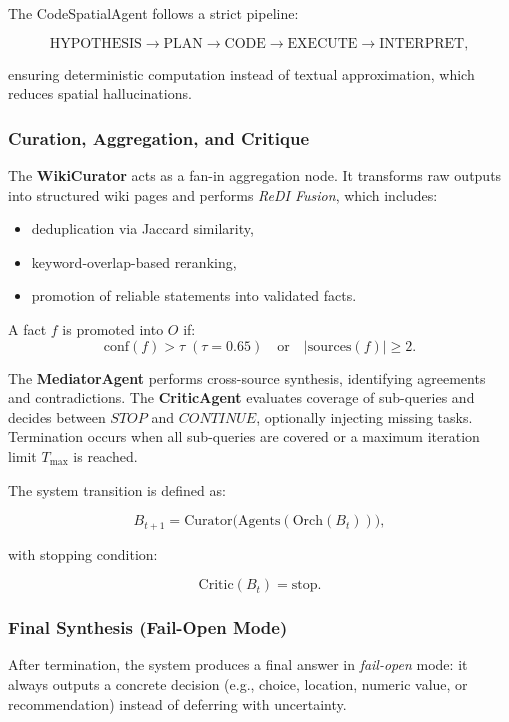 The CodeSpatialAgent follows a strict pipeline:

\[
\text{HYPOTHESIS} \rightarrow \text{PLAN} \rightarrow \text{CODE} \rightarrow \text{EXECUTE} \rightarrow \text{INTERPRET},
\]

ensuring deterministic computation instead of textual approximation, which reduces spatial hallucinations.

\subsubsection{Curation, Aggregation, and Critique}

The \textbf{WikiCurator} acts as a fan-in aggregation node.
It transforms raw outputs into structured wiki pages and performs \emph{ReDI Fusion}, which includes:

\begin{itemize}
    \item deduplication via Jaccard similarity,
    \item keyword-overlap-based reranking,
    \item promotion of reliable statements into validated facts.
\end{itemize}

A fact $f$ is promoted into $O$ if:
\[
\mathrm{conf}(f) > \tau \; (\tau = 0.65)
\quad \text{or} \quad
|\mathrm{sources}(f)| \ge 2.
\]

The \textbf{MediatorAgent} performs cross-source synthesis, identifying agreements and contradictions.
The \textbf{CriticAgent} evaluates coverage of sub-queries and decides between $STOP$ and $CONTINUE$, optionally injecting missing tasks.
Termination occurs when all sub-queries are covered or a maximum iteration limit $T_{\max}$ is reached.

The system transition is defined as:

\[
B_{t+1} = \mathrm{Curator}\!\big(\mathrm{Agents}(\mathrm{Orch}(B_t))\big),
\]

with stopping condition:

\[
\mathrm{Critic}(B_t)=\text{stop}.
\]

\subsubsection{Final Synthesis (Fail-Open Mode)}

After termination, the system produces a final answer in \emph{fail-open} mode: it always outputs a concrete decision (e.g., choice, location, numeric value, or recommendation) instead of deferring with uncertainty.

